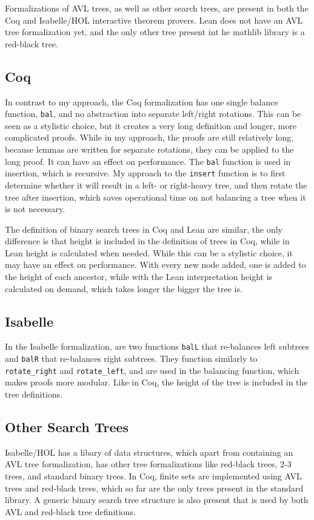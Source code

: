 Formalizations of AVL trees, as well as other search trees, are present in both the Coq \cite{code:coq_avl} and Isabelle/HOL \cite{isabelle} interactive theorem provers. Lean does not have an AVL tree formalization yet, and the only other tree present int he mathlib library is a red-black tree. 

\subsection*{Coq}
In contrast to my approach, the Coq formalization has one single balance function, \lstinline{bal}, and no abstraction into separate left/right rotations. This can be seen as a stylistic choice, but it creates a very long definition and longer, more complicated proofs. While in my approach, the proofs are still relatively long, because lemmas are written for separate rotations, they can be applied to the long proof. It can have an effect on performance. The \lstinline{bal} function is used in insertion, which is recursive. My approach to the \lstinline{insert} function is to first determine whether it will result in a left- or right-heavy tree, and then rotate the tree after insertion, which saves operational time on not balancing a tree when it is not necessary.  

The definition of binary search trees in Coq and Lean are similar, the only difference is that height is included in the definition of trees in Coq, while in Lean height is calculated when needed. While this can be a stylistic choice, it may have an effect on performance. With every new node added, one is added to the height of each ancestor, while with the Lean interpretation height is calculated on demand, which takes longer the bigger the tree is.

\subsection*{Isabelle}
In the Isabelle formalization, are two functions \lstinline{balL} that re-balances left subtrees and \lstinline{balR} that re-balances right subtrees. They function similarly to \lstinline{rotate_right} and \lstinline{rotate_left}, and are used in the balancing function, which makes proofs more modular. Like in Coq, the height of the tree is included in the tree definitions.

\subsection*{Other Search Trees}
Isabelle/HOL has a libary of data structures, which apart from containing an AVL tree formalization, has other tree formalizations like red-black trees, 2-3 trees, and standard binary trees. In Coq, finite sets are implemented using AVL trees and red-black trees, which so far are the only trees present in the standard library. A generic binary search tree structure is also present that is used by both AVL and red-black tree definitions.

